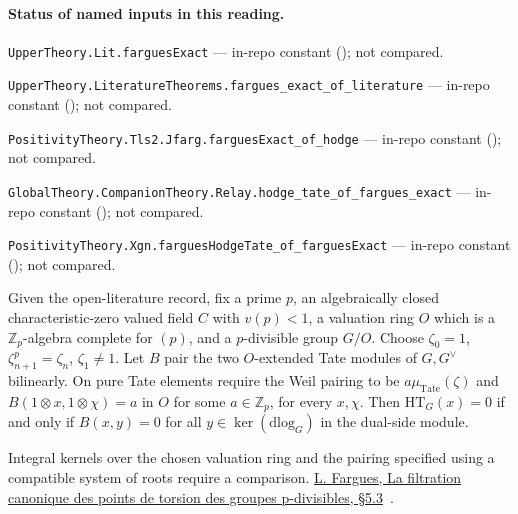 

\paragraph{Status of named inputs in this reading.}
\noindent\nolinkurl{UpperTheory.Lit.farguesExact} --- in-repo constant (); not compared.\par
\noindent\nolinkurl{UpperTheory.LiteratureTheorems.fargues_exact_of_literature} --- in-repo constant (); not compared.\par
\noindent\nolinkurl{PositivityTheory.Tls2.Jfarg.farguesExact_of_hodge} --- in-repo constant (); not compared.\par
\noindent\nolinkurl{GlobalTheory.CompanionTheory.Relay.hodge_tate_of_fargues_exact} --- in-repo constant (); not compared.\par
\noindent\nolinkurl{PositivityTheory.Xgn.farguesHodgeTate_of_farguesExact} --- in-repo constant (); not compared.\par

\begin{formalstatement}\label{sub:T24}

Given the open-literature record, fix a prime $p$, an algebraically closed
characteristic-zero valued field $C$ with $v(p)<1$, a valuation ring $O$
which is a $\mathbb Z_p$-algebra complete for $(p)$, and a $p$-divisible
group $G/O$. Choose $\zeta_0=1$, $\zeta_{n+1}^p=\zeta_n$, $\zeta_1\ne1$.
Let $B$ pair the two $O$-extended Tate modules of $G,G^\vee$ bilinearly.
On pure Tate elements require the Weil pairing to be
$a\mu_{\mathrm{Tate}}(\zeta)$ and $B(1\otimes x,1\otimes\chi)=a$ in $O$
for some $a\in\mathbb Z_p$, for every $x,\chi$.
Then $\mathrm{HT}_G(x)=0$ if and only if $B(x,y)=0$ for all
$y\in\ker(\mathrm{dlog}_G)$ in the dual-side module.

\end{formalstatement}

\noindent Integral kernels over the chosen valuation ring and the pairing specified using a compatible system of roots require a comparison. \href{https://doi.org/10.24033/asens.2157}{L. Fargues, La filtration canonique des points de torsion des groupes p-divisibles, §5.3}~\cite{r21-fargues}.

